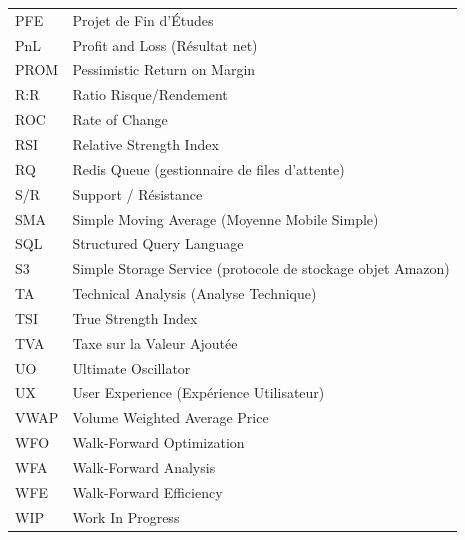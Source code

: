 \begin{longtable}{@{}ll@{}}
PFE   & Projet de Fin d'Études \\
PnL   & Profit and Loss (Résultat net) \\
PROM  & Pessimistic Return on Margin \\
R:R   & Ratio Risque/Rendement \\
ROC   & Rate of Change \\
RSI   & Relative Strength Index \\
RQ    & Redis Queue (gestionnaire de files d'attente) \\
S/R   & Support / Résistance \\
SMA   & Simple Moving Average (Moyenne Mobile Simple) \\
SQL   & Structured Query Language \\
S3    & Simple Storage Service (protocole de stockage objet Amazon) \\
TA    & Technical Analysis (Analyse Technique) \\
TSI   & True Strength Index \\
TVA   & Taxe sur la Valeur Ajoutée \\
UO    & Ultimate Oscillator \\
UX    & User Experience (Expérience Utilisateur) \\
VWAP  & Volume Weighted Average Price \\
WFO   & Walk-Forward Optimization \\
WFA   & Walk-Forward Analysis \\
WFE   & Walk-Forward Efficiency \\
WIP   & Work In Progress \\
\bottomrule
\end{longtable}
